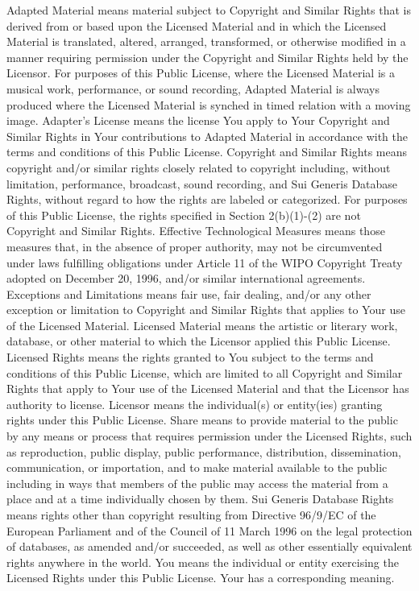 Adapted Material means material subject to Copyright and Similar Rights that is derived from or based upon the Licensed Material and in which the Licensed Material is translated, altered, arranged, transformed, or otherwise modified in a manner requiring permission under the Copyright and Similar Rights held by the Licensor. For purposes of this Public License, where the Licensed Material is a musical work, performance, or sound recording, Adapted Material is always produced where the Licensed Material is synched in timed relation with a moving image.
Adapter's License means the license You apply to Your Copyright and Similar Rights in Your contributions to Adapted Material in accordance with the terms and conditions of this Public License.
Copyright and Similar Rights means copyright and/or similar rights closely related to copyright including, without limitation, performance, broadcast, sound recording, and Sui Generis Database Rights, without regard to how the rights are labeled or categorized. For purposes of this Public License, the rights specified in Section 2(b)(1)-(2) are not Copyright and Similar Rights.
Effective Technological Measures means those measures that, in the absence of proper authority, may not be circumvented under laws fulfilling obligations under Article 11 of the WIPO Copyright Treaty adopted on December 20, 1996, and/or similar international agreements.
Exceptions and Limitations means fair use, fair dealing, and/or any other exception or limitation to Copyright and Similar Rights that applies to Your use of the Licensed Material.
Licensed Material means the artistic or literary work, database, or other material to which the Licensor applied this Public License.
Licensed Rights means the rights granted to You subject to the terms and conditions of this Public License, which are limited to all Copyright and Similar Rights that apply to Your use of the Licensed Material and that the Licensor has authority to license.
Licensor means the individual(s) or entity(ies) granting rights under this Public License.
Share means to provide material to the public by any means or process that requires permission under the Licensed Rights, such as reproduction, public display, public performance, distribution, dissemination, communication, or importation, and to make material available to the public including in ways that members of the public may access the material from a place and at a time individually chosen by them.
Sui Generis Database Rights means rights other than copyright resulting from Directive 96/9/EC of the European Parliament and of the Council of 11 March 1996 on the legal protection of databases, as amended and/or succeeded, as well as other essentially equivalent rights anywhere in the world.
You means the individual or entity exercising the Licensed Rights under this Public License. Your has a corresponding meaning.

